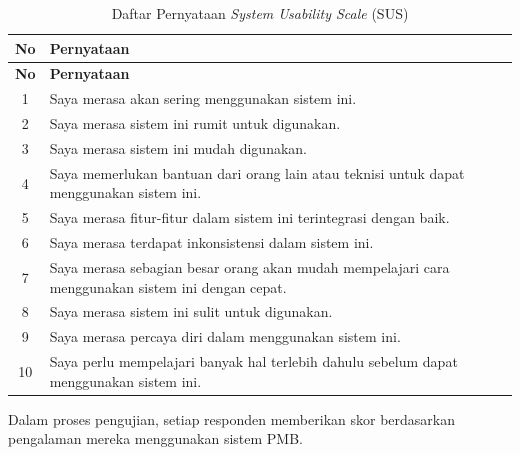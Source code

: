 \begin{longtable}{|c|p{}|}
	\caption{Daftar Pernyataan \textit{System Usability Scale} (SUS)}
	\label{table:3.pernyataansus}\\
	\hline
	\textbf{No} & \textbf{Pernyataan} \\
	\hline
	\endfirsthead
	\hline
	\textbf{No} & \textbf{Pernyataan} \\
	\hline
	\endhead
	1 & Saya merasa akan sering menggunakan sistem ini. \\
	\hline
	2 & Saya merasa sistem ini rumit untuk digunakan. \\
	\hline
	3 & Saya merasa sistem ini mudah digunakan. \\
	\hline
	4 & Saya memerlukan bantuan dari orang lain atau teknisi untuk dapat menggunakan sistem ini. \\
	\hline
	5 & Saya merasa fitur-fitur dalam sistem ini terintegrasi dengan baik. \\
	\hline
	6 & Saya merasa terdapat inkonsistensi dalam sistem ini. \\
	\hline
	7 & Saya merasa sebagian besar orang akan mudah mempelajari cara menggunakan sistem ini dengan cepat. \\
	\hline
	8 & Saya merasa sistem ini sulit untuk digunakan. \\
	\hline
	9 & Saya merasa percaya diri dalam menggunakan sistem ini. \\
	\hline
	10 & Saya perlu mempelajari banyak hal terlebih dahulu sebelum dapat menggunakan sistem ini. \\
	\hline
\end{longtable}

Dalam proses pengujian, setiap responden memberikan skor berdasarkan pengalaman mereka menggunakan sistem PMB.\par
